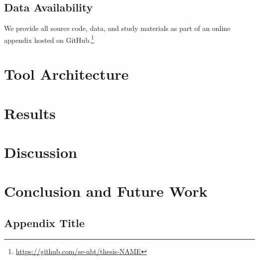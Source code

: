 \documentclass[
    pdftex,
    final,
    11pt,
    a4paper,
    parskip=false, %
    twoside, %
    footheight=0mm, %
    footinclude=false,
    toc=bibliography, %
    toc=listof %
]{scrbook} %
\begin{document}
\lipsum[1-4]

\section{Data Availability}
\label{sec:data-availability}

We provide all source code, data, and study materials as part of an online appendix hosted on GitHub.\footnote{\url{https://github.com/se-ubt/thesis-NAME}}


\chapter{Tool Architecture}
\label{ch:tool-architecture}

\lipsum[1-4]

\chapter{Results}
\label{ch:results}

\lipsum[1-4]

\chapter{Discussion}
\label{ch:discussion}

\lipsum[1-4]

\chapter{Conclusion and Future Work}
\label{ch:conclusion}

\lipsum[1-4]

\listoffigures
 
\listoftables




\begin{appendices}

\chapter{Appendix Title}

\end{appendices}

\backmatter
\end{document}
